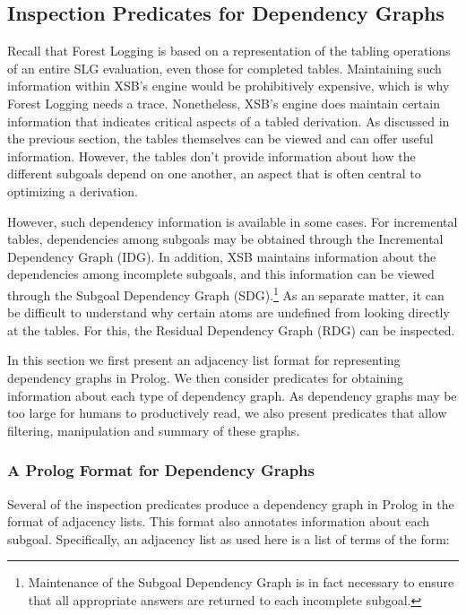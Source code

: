 \subsection{Inspection Predicates for Dependency Graphs} \label{sec:dep-graph}

Recall that Forest Logging is based on a representation of the tabling
operations of an entire SLG evaluation, even those for completed
tables.  Maintaining such information within XSB's engine would be
prohibitively expensive, which is why Forest Logging needs a trace.
Nonetheless, XSB's engine does maintain certain information that
indicates critical aspects of a tabled derivation.  As discussed in
the previous section, the tables themselves can be viewed and can
offer useful information.  However, the tables don't provide
information about how the different subgoals depend on one another, an
aspect that is often central to optimizing a derivation.  

However, such dependency information is available in some cases.  For
incremental tables, dependencies among subgoals may be obtained
through the Incremental Dependency Graph (IDG).  In addition, XSB
maintains information about the dependencies among incomplete
subgoals, and this information can be viewed through the Subgoal
Dependency Graph (SDG).\footnote{Maintenance of the Subgoal Dependency
  Graph is in fact necessary to ensure that all appropriate answers
  are returned to each incomplete subgoal.}  As an separate matter, it
can be difficult to understand why certain atoms are undefined from
looking directly at the tables.  For this, the Residual Dependency
Graph (RDG) can be inspected.

In this section we first present an adjacency list format for
representing dependency graphs in Prolog.  We then consider predicates
for obtaining information about each type of dependency graph.  As
dependency graphs may be too large for humans to productively read, we
also present predicates that allow filtering, manipulation and summary
of these graphs.

\subsubsection{A Prolog Format for Dependency Graphs} \label{sec:adjacency-lists}

Several of the inspection predicates produce a dependency graph in Prolog
in the format of adjacency lists.  This format also annotates
information about each subgoal.  Specifically, an adjacency list as
used here is a list of terms of the form:

